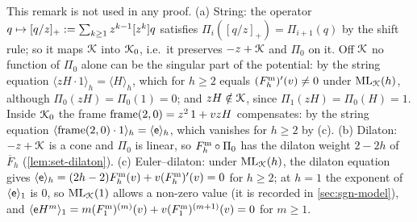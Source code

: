 \begin{rmk}
\label{rmk:tra-consistency}
This remark is not used in any proof. (a) String: the operator $q\mapsto[q/z]_+ := \sum_{k\geq 1}z^{k-1}[z^k]q$ satisfies $\Pi_i([q/z]_+) = \Pi_{i+1}(q)$ by the shift rule; so it maps $\mathcal{K}$ into $\mathcal{K}_{0}$, i.e.\ it preserves $-z+\mathcal{K}$ and $\Pi_0$ on it. Off $\mathcal{K}$ no function of $\Pi_0$ alone can be the singular part of the potential: by the string equation $\langle zH\cdot 1\rangle_h = \langle H\rangle_h$, which for $h\geq 2$ equals $(F^{\mathrm{m}}_h)'(v)\neq 0$ under $\mathrm{ML}_{\mathcal{K}}(h)$, although $\Pi_0(zH) = \Pi_0(1) = 0$; and $zH\notin\mathcal{K}$, since $\Pi_1(zH) = \Pi_0(H) = 1$. Inside $\mathcal{K}_{0}$ the frame $\mathrm{frame}(2,0) = z^2\,1+vzH$ compensates: by the string equation $\langle\mathrm{frame}(2,0)\cdot 1\rangle_h = \langle\mathsf{e}\rangle_h$, which vanishes for $h\geq 2$ by (c). (b) Dilaton: $-z+\mathcal{K}$ is a cone and $\Pi_0$ is linear, so $F^{\mathrm{m}}_h\circ\Pi_0$ has the dilaton weight $2-2h$ of $\overline F_h$ (\cref{lem:set-dilaton}). (c) Euler--dilaton: under $\mathrm{ML}_{\mathcal{K}}(h)$, the dilaton equation gives $\langle\mathsf{e}\rangle_h = (2h-2)F^{\mathrm{m}}_h(v)+v(F^{\mathrm{m}}_h)'(v) = 0$ for $h\geq 2$; at $h = 1$ the exponent of $\langle\mathsf{e}\rangle_1$ is $0$, so $\mathrm{ML}_{\mathcal{K}}(1)$ allows a non-zero value (it is recorded in \cref{sec:sgn-model}), and $\langle\mathsf{e} H^m\rangle_1 = m(F^{\mathrm{m}}_1)^{(m)}(v)+v(F^{\mathrm{m}}_1)^{(m+1)}(v) = 0$ for $m\geq 1$.
\end{rmk}


